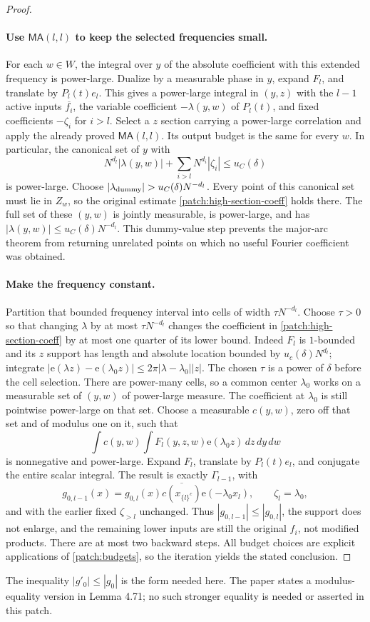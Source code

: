 \documentclass[11pt]{article}
\theoremstyle{definition}
\newcommand{\ee}[1]{\mathrm e\!\left(#1\right)}
\begin{document}
\begin{proof}
\paragraph{Use $\mathsf{MA}(l,l)$ to keep the selected frequencies small.}
For each $w\in W$, the integral over $y$ of the absolute coefficient with this extended
frequency is power-large.  Dualize by a measurable phase in $y$, expand $F_l$, and translate
by $P_l(t)e_l$.  This gives a power-large integral in $(y,z)$ with the $l-1$ active inputs
$\overline{f_i}$, the variable coefficient $-\lambda(y,w)$ of $P_l(t)$, and fixed coefficients
$-\zeta_i$ for $i>l$.
Select a $z$ section carrying a power-large correlation and apply the already proved
$\mathsf{MA}(l,l)$.  Its output budget is the same for every $w$.
In particular, the canonical set of $y$ with
\[
 N^{d_l}|\lambda(y,w)|+\sum_{i>l}N^{d_i}|\zeta_i|\leq u_C(\delta)
\]
is power-large.  Choose $|\lambda_{\rm dummy}|>u_C(\delta)N^{-d_l}$.
Every point of this canonical set must lie in $Z_w$, so the original estimate
\eqref{patch:high-section-coeff} holds there.  The full set of these $(y,w)$ is jointly
measurable, is power-large, and has $|\lambda(y,w)|\leq u_C(\delta)N^{-d_l}$.
This dummy-value step prevents the major-arc theorem from returning unrelated points on
which no useful Fourier coefficient was obtained.

\paragraph{Make the frequency constant.}
Partition that bounded frequency interval into cells of width $\tau N^{-d_l}$.
Choose $\tau>0$ so that changing $\lambda$ by at most $\tau N^{-d_l}$ changes the coefficient
in \eqref{patch:high-section-coeff} by at most one quarter of its lower bound.
Indeed $F_l$ is $1$-bounded and its $z$ support has length and absolute location bounded
by $u_c(\delta)N^{d_l}$; integrate
$|\ee{\lambda z}-\ee{\lambda_0 z}|\leq2\pi|\lambda-\lambda_0||z|$.
The chosen $\tau$ is a power of $\delta$ before the cell selection.
There are power-many cells, so a common center $\lambda_0$ works on a measurable set of
$(y,w)$ of power-large measure.  The coefficient at $\lambda_0$ is still pointwise power-large
on that set.  Choose a measurable $c(y,w)$, zero off that set and of modulus one on it,
such that
\[
 \int c(y,w)\int F_l(y,z,w)\ee{\lambda_0z}\,dz\,dy\,dw
\]
is nonnegative and power-large.
Expand $F_l$, translate by $P_l(t)e_l$, and conjugate the entire scalar integral.
The result is exactly $\Gamma_{l-1}$, with
\[
 g_{0,l-1}(x)=g_{0,l}(x)\overline{c(x_{\{l\}^c})}\ee{-\lambda_0x_l},
 \qquad \zeta_l=\lambda_0,
\]
and with the earlier fixed $\zeta_{>l}$ unchanged.  Thus
$|g_{0,l-1}|\leq|g_{0,l}|$, the support does not enlarge, and the remaining lower inputs are
still the original $f_i$, not modified products.
There are at most two backward steps.  All budget choices are explicit applications of
\cref{patch:budgets}, so the iteration yields the stated conclusion.
\end{proof}
The inequality $|g'_0|\leq|g_0|$ is the form needed here.  The paper states a modulus-equality
version in Lemma 4.71; no such stronger equality is needed or asserted in this patch.
\end{document}
